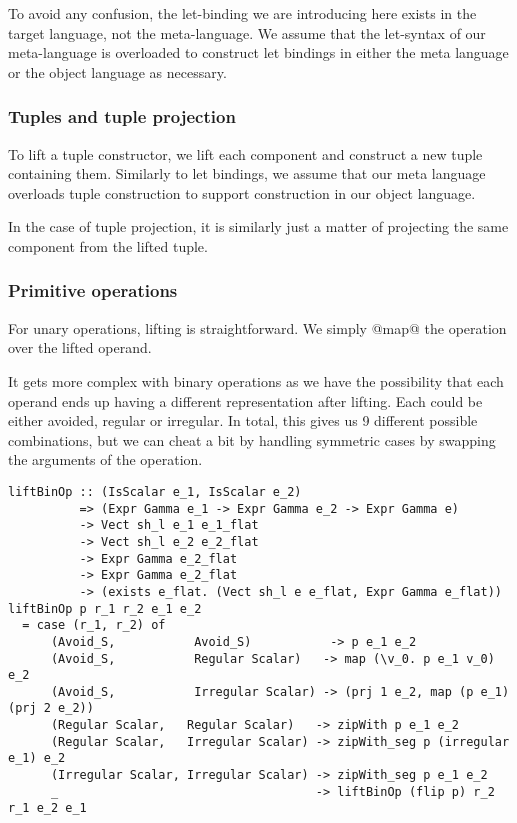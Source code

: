 To avoid any confusion, the let-binding we are introducing here exists in the target language, not the meta-language. We assume that the let-syntax of our meta-language is overloaded to construct let bindings in either the meta language or the object language as necessary.

\subsubsection{Tuples and tuple projection}
To lift a tuple constructor, we lift each component and construct a new tuple containing them. Similarly to let bindings, we assume that our meta language overloads tuple construction to support construction in our object language.

In the case of tuple projection, it is similarly just a matter of projecting the same component from the lifted tuple.

\subsubsection{Primitive operations}
For unary operations, lifting is straightforward. We simply @map@ the operation over the lifted operand.

It gets more complex with binary operations as we have the possibility that each operand ends up having a different representation after lifting. Each could be either avoided, regular or irregular. In total, this gives us 9 different possible combinations, but we can cheat a bit by handling symmetric cases by swapping the arguments of the operation.
%
\begin{lstlisting}[style=ndp]
liftBinOp :: (IsScalar e_1, IsScalar e_2)
          => (Expr Gamma e_1 -> Expr Gamma e_2 -> Expr Gamma e)
          -> Vect sh_l e_1 e_1_flat
          -> Vect sh_l e_2 e_2_flat
          -> Expr Gamma e_2_flat
          -> Expr Gamma e_2_flat
          -> (exists e_flat. (Vect sh_l e e_flat, Expr Gamma e_flat))
liftBinOp p r_1 r_2 e_1 e_2
  = case (r_1, r_2) of
      (Avoid_S,           Avoid_S)           -> p e_1 e_2
      (Avoid_S,           Regular Scalar)   -> map (\v_0. p e_1 v_0) e_2
      (Avoid_S,           Irregular Scalar) -> (prj 1 e_2, map (p e_1) (prj 2 e_2))
      (Regular Scalar,   Regular Scalar)   -> zipWith p e_1 e_2
      (Regular Scalar,   Irregular Scalar) -> zipWith_seg p (irregular e_1) e_2
      (Irregular Scalar, Irregular Scalar) -> zipWith_seg p e_1 e_2
      _                                    -> liftBinOp (flip p) r_2 r_1 e_2 e_1
\end{lstlisting}
%

